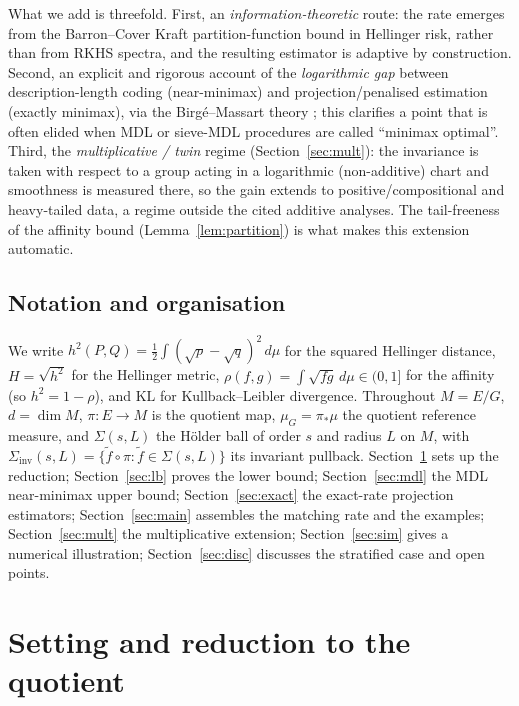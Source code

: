 \documentclass[11pt]{article}
\theoremstyle{plain}
\theoremstyle{definition}
\theoremstyle{remark}
\newcommand{\KL}{\mathrm{KL}}
\newcommand{\Siv}{\Sigma_{\mathrm{inv}}}
\DeclareMathOperator{\dimm}{dim}
\begin{document}
What we add is threefold. First, an \emph{information-theoretic} route: the rate
emerges from the Barron--Cover \cite{barroncover} Kraft partition-function bound in
Hellinger risk, rather than from RKHS spectra, and the resulting estimator is
adaptive by construction. Second, an explicit and rigorous account of the
\emph{logarithmic gap} between description-length coding (near-minimax) and
projection/penalised estimation (exactly minimax), via the Birg\'e--Massart theory
\cite{birgemassart98,massart}; this clarifies a point that is often elided when MDL
or sieve-MDL procedures are called ``minimax optimal''. Third, the
\emph{multiplicative / twin} regime (Section~\ref{sec:mult}): the invariance is
taken with respect to a group acting in a logarithmic (non-additive) chart and
smoothness is measured there, so the gain extends to positive/compositional and
heavy-tailed data, a regime outside the cited additive analyses. The
tail-freeness of the affinity bound (Lemma~\ref{lem:partition}) is what makes this
extension automatic.

\subsection{Notation and organisation}

We write $h^2(P,Q)=\tfrac12\int(\sqrt{p}-\sqrt q)^2\,d\mu$ for the squared
Hellinger distance, $H=\sqrt{h^2}$ for the Hellinger metric,
$\rho(f,g)=\int\sqrt{fg}\,d\mu\in(0,1]$ for the affinity (so $h^2=1-\rho$), and
$\KL$ for Kullback--Leibler divergence. Throughout $M=E/G$, $d=\dimm M$,
$\pi:E\to M$ is the quotient map, $\mu_G=\pi_*\mu$ the quotient reference measure,
and $\Sigma(s,L)$ the H\"older ball of order $s$ and radius $L$ on $M$, with
$\Siv(s,L)=\{\tilde f\circ\pi:\tilde f\in\Sigma(s,L)\}$ its invariant pullback.
Section~\ref{sec:setting} sets up the reduction; Section~\ref{sec:lb} proves the
lower bound; Section~\ref{sec:mdl} the MDL near-minimax upper bound;
Section~\ref{sec:exact} the exact-rate projection estimators;
Section~\ref{sec:main} assembles the matching rate and the examples;
Section~\ref{sec:mult} the multiplicative extension; Section~\ref{sec:sim} gives a
numerical illustration; Section~\ref{sec:disc} discusses the stratified case and
open points.

\section{Setting and reduction to the quotient}\label{sec:setting}
\end{document}
